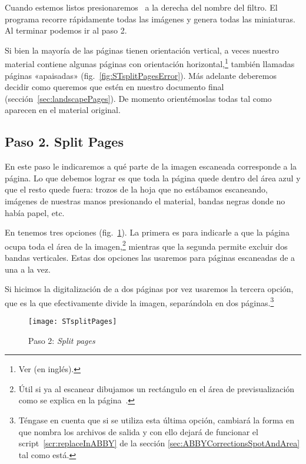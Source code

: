 \documentclass[%
	a5paper,
	10pt,
	twoside,
	openright,
	final,
]{memoir}
\begin{document}
	Cuando estemos listos presionaremos \play\ a la derecha del nombre del filtro. El programa recorre rápidamente todas las imágenes y genera todas las miniaturas. Al terminar podemos ir al paso 2.

	 Si bien la mayoría de las páginas tienen orientación vertical, a veces nuestro material contiene algunas páginas con orientación horizontal,\footnote{Ver \cite{WikipediaPageOrientation} (en inglés).} también llamadas páginas «apaisadas» (fig.~\ref{fig:STsplitPagesError}). Más adelante deberemos decidir como queremos que estén en nuestro documento final (sección~\ref{sec:landscapePages}). De momento orientémoslas todas tal como aparecen en el material original.

	\subsection{Paso 2. Split Pages\label{sec:STsplitPages}} En este paso le indicaremos a \scantailor qué parte de la imagen escaneada corresponde a la página. Lo que debemos lograr es que toda la página quede dentro del área azul y que el resto quede fuera: trozos de la hoja que no estábamos escaneando, imágenes de nuestras manos presionando el material, bandas negras donde no había papel, etc.

	En  tenemos tres opciones (fig.~\ref{fig:STsplitPages}). La primera es para indicarle a \scantailor que la página ocupa toda el área de la imagen,\footnote{Útil si ya al escanear dibujamos un rectángulo en el área de previsualización como se explica en la página~\pageref{pag:scanningRegionSelection}.} mientras que la segunda permite excluir dos bandas verticales. Estas dos opciones las usaremos para páginas escaneadas de a una a la vez.

	Si hicimos la digitalización de a dos páginas por vez usaremos la tercera opción, que es la que efectivamente divide la imagen, separándola en dos páginas.\footnote{Téngase en cuenta que si se utiliza esta última opción, cambiará la forma en que \scantailor nombra los archivos de salida y con ello dejará de funcionar el script~\ref{scr:replaceInABBY} de la sección \ref{sec:ABBYCorrectionsSpotAndArea} tal como está.}

	\begin{figure}
		\centering
		\texttt{[image: STsplitPages]}
		\caption{Paso 2: \emph{Split pages}\label{fig:STsplitPages}}
	\end{figure}
\end{document}
